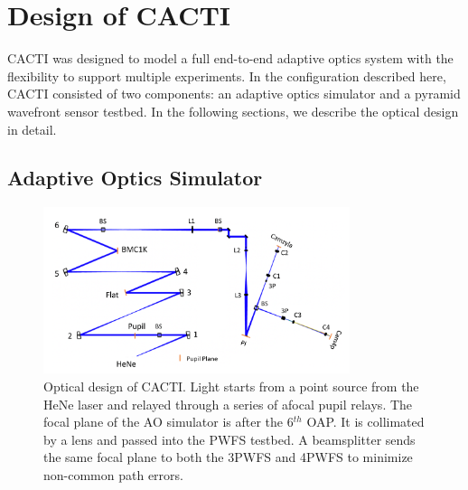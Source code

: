 \section{Design of CACTI}
CACTI was designed to model a full end-to-end adaptive optics system with the flexibility to support multiple experiments. In the configuration described here, CACTI consisted of two components: an adaptive optics simulator and a pyramid wavefront sensor testbed. In the following sections, we describe the optical design in detail. 

\subsection{Adaptive Optics Simulator}

\begin{figure}
    \centering
    \includegraphics[width=0.8\textwidth]{Chapter Materials/Chapter Five Materials/CACTIzemax.png}
    \caption{Optical design of CACTI. Light starts from a point source from the HeNe laser and relayed through a series of afocal pupil relays. The focal plane of the AO simulator is after the 6${^{th}}$ OAP. It is collimated by a lens and passed into the PWFS testbed. A beamsplitter sends the same focal plane to both the 3PWFS and 4PWFS to minimize non-common path errors.}
    \label{fig:CACTIZemax}
\end{figure}

